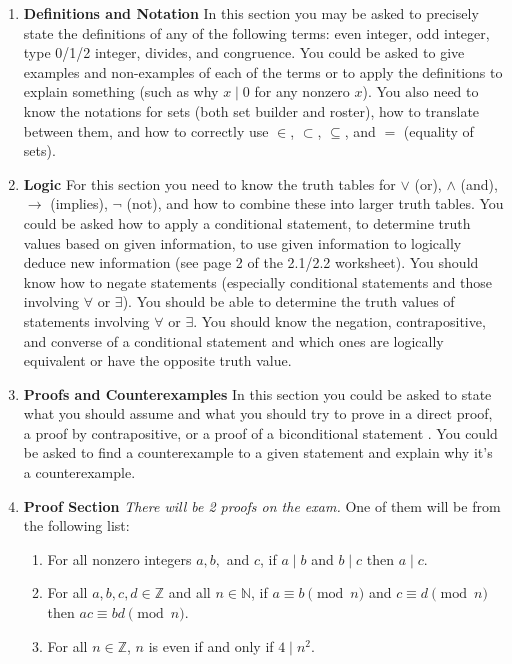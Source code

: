 \documentclass[12pt]{amsart}
\theoremstyle{definition}
\begin{document}
\begin{enumerate}
\item {\bf Definitions and Notation} In this section  you may be asked to precisely state the definitions of any of the following terms: even integer, odd integer, type 0/1/2 integer, divides, and congruence. You could be asked to give examples and non-examples of each of the terms or to apply the definitions to explain something (such as why $x\mid 0$ for any nonzero $x$). You also need to know the notations for sets (both set builder and roster), how to translate between them, and how to correctly use $\in$, $\subset$, $\subseteq$, and $=$ (equality of sets).
\vfill
\item {\bf  Logic} For this section you need to know the truth tables for $\vee$ (or), $\wedge$ (and), $\rightarrow$ (implies), $\neg$ (not), and how to combine these into larger truth tables. You could be asked how to apply a conditional statement, to determine truth values based on given information, to use given information to logically deduce new information  (see page 2 of the 2.1/2.2 worksheet). You should know how to negate statements (especially conditional statements and those involving $\forall$ or $\exists$). You should be able to determine the truth values of statements involving $\forall$ or $\exists$. You should know the negation, contrapositive, and converse of a conditional statement and which ones are logically equivalent or have the opposite truth value.
\vfill
\item {\bf Proofs and Counterexamples}  In this section you could be asked to state what you should assume and what you should try to prove in a direct proof, a proof by contrapositive, or a proof of a biconditional statement . You could be asked to find a counterexample to a given statement and explain why it's a counterexample. 
\vfill

\item {\bf Proof Section} \emph{ There will be 2 proofs on the exam.} One of them will be from the following list:
\begin{enumerate}
\item For all nonzero integers $a,b,$ and $c$, if $a\mid b$ and $b\mid c$ then $a\mid c$.

\item For all $a,b,c,d\in\mathbb{Z}$ and all $n\in\mathbb{N}$, if $a\equiv b \pmod{n}$ and $c\equiv d\pmod{n}$ then $ac\equiv bd\pmod{n}$.


\item For all $n\in\mathbb{Z}$, $n$ is even if and only if $4\mid n^2$.




\end{enumerate}
\end{enumerate}
\end{document}
